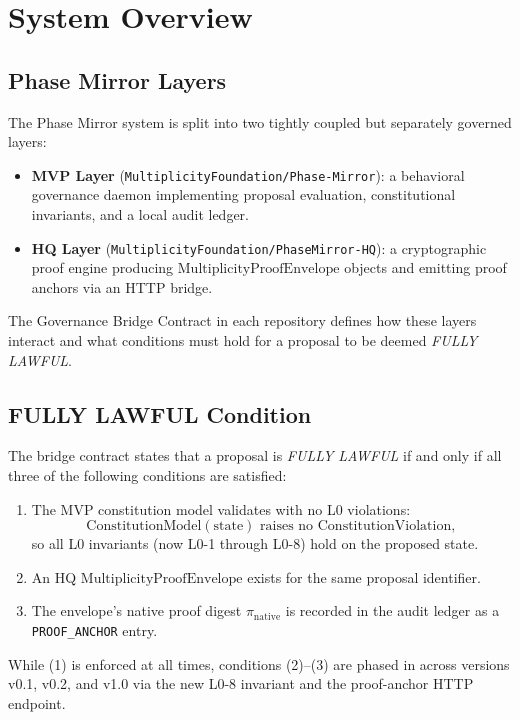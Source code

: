 \documentclass[11pt]{article}
\begin{document}

\section{System Overview}

\subsection{Phase Mirror Layers}

The Phase Mirror system is split into two tightly coupled but separately governed layers:\cite{cite:44,cite:46,cite:47}
\begin{itemize}[nosep]
  \item \textbf{MVP Layer} (\texttt{MultiplicityFoundation/Phase-Mirror}): a behavioral governance daemon implementing proposal evaluation, constitutional invariants, and a local audit ledger.
  \item \textbf{HQ Layer} (\texttt{MultiplicityFoundation/PhaseMirror-HQ}): a cryptographic proof engine producing \(\mathrm{MultiplicityProofEnvelope}\) objects and emitting proof anchors via an HTTP bridge.
\end{itemize}
The Governance Bridge Contract in each repository defines how these layers interact and what conditions must hold for a proposal to be deemed \emph{FULLY LAWFUL}.\cite{cite:44,cite:46,cite:47}

\subsection{FULLY LAWFUL Condition}

The bridge contract states that a proposal is \emph{FULLY LAWFUL} if and only if all three of the following conditions are satisfied:\cite{cite:44,cite:46,cite:47}
\begin{enumerate}[nosep]
  \item The MVP constitution model validates with no L0 violations:
  \[
    \mathrm{ConstitutionModel}(\text{state}) \text{ raises no ConstitutionViolation},
  \]
  so all L0 invariants (now L0-1 through L0-8) hold on the proposed state.\cite{cite:40,cite:41,cite:42}
  \item An HQ \(\mathrm{MultiplicityProofEnvelope}\) exists for the same proposal identifier.
  \item The envelope's native proof digest \(\pi_{\mathrm{native}}\) is recorded in the audit ledger as a \texttt{PROOF\_ANCHOR} entry.\cite{cite:41,cite:44,cite:46,cite:47}
\end{enumerate}
While (1) is enforced at all times, conditions (2)--(3) are phased in across versions v0.1, v0.2, and v1.0 via the new L0-8 invariant and the proof-anchor HTTP endpoint.\cite{cite:41,cite:44,cite:46,cite:47}
\end{document}

